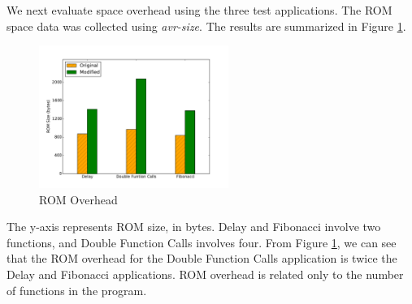 We next evaluate space overhead using the three test applications. The ROM space data was collected using \textit{avr-size}. The results are summarized in Figure \ref{fig:space_overhead}. 
\begin{figure}
	\vspace{-25pt}
	\begin{center}
		\includegraphics[width=0.55\textwidth]{figures/space_overhead.pdf}
	\end{center}
	\vspace{-15pt}
	\caption{ROM Overhead}
	\vspace{-15pt}
	\label{fig:space_overhead}
\end{figure}
The y-axis represents ROM size, in bytes. Delay and Fibonacci involve two functions, and Double Function Calls involves four. From Figure \ref{fig:space_overhead}, we can see that the ROM overhead for the Double Function Calls application is twice the Delay and Fibonacci applications. ROM overhead is related only to the number of functions in the program.

